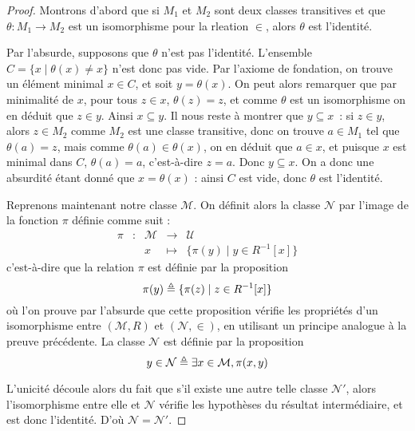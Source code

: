\begin{proof}
  Montrons d'abord que si $M_1$ et $M_2$ sont deux classes transitives et que
  $\theta : M_1\to M_2$ est un isomorphisme pour la rleation $\in$, alors
  $\theta$ est l'identité.

  Par l'absurde, supposons que $\theta$ n'est pas l'identité. L'ensemble
  $C = \{x\mid \theta(x)\neq x\}$ n'est donc pas vide. Par l'axiome de
  fondation, on trouve un élément minimal $x\in C$, et soit $y = \theta(x)$. On
  peut alors remarquer que par minimalité de $x$, pour tous $z\in x$,
  $\theta(z)=z$, et comme $\theta$ est un isomorphisme on en déduit que
  $z\in y$. Ainsi $x\subseteq y$. Il nous reste à montrer que $y\subseteq x$~:
  si $z\in y$, alors $z\in M_2$ comme $M_2$ est une classe transitive, donc on
  trouve $a\in M_1$ tel que $\theta(a)=z$, mais comme $\theta(a)\in \theta(x)$,
  on en déduit que $a\in x$, et puisque $x$ est minimal dans $C$, $\theta(a)=a$,
  c'est-à-dire $z = a$. Donc $y\subseteq x$. On a donc une absurdité étant donné
  que $x = \theta(x)$ : ainsi $C$ est vide, donc $\theta$ est l'identité.

  Reprenons maintenant notre classe $\mathcal M$. On définit alors la classe
  $\mathcal N$ par l'image de la fonction $\pi$ définie comme suit :
  \[\begin{array}{rcccl}
  \pi & : & \mathcal M & \longrightarrow & \mathcal U\\
  & & x & \longmapsto & \{\pi(y)\mid y \in R^{-1}[x]\}
  \end{array}\]
  c'est-à-dire que la relation $\pi$ est définie par la proposition
  \[\pi(y) \triangleq \{\pi(z)\mid z \in R^{-1}[x]\}\]
  où l'on prouve par l'absurde que cette proposition vérifie les propriétés d'un
  isomorphisme entre $(\mathcal M,R)$ et $(\mathcal N,\in)$, en utilisant un
  principe analogue à la preuve précédente. La classe $\mathcal N$ est définie
  par la proposition
  \[y \in \mathcal N \triangleq \exists x\in\mathcal M, \pi(x,y)\]

  L'unicité découle alors du fait que s'il existe une autre telle classe
  $\mathcal N'$, alors l'isomorphisme entre elle et $\mathcal N$ vérifie les
  hypothèses du résultat intermédiaire, et est donc l'identité. D'où
  $\mathcal N = \mathcal N'$.
\end{proof}

